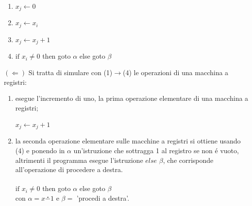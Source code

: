\begin{enumerate}
\item 
 $x_j \leftarrow 0$ \hspace{10mm} 
 \vspace{10mm}

\item $x_j \leftarrow x_i $ \hspace{10mm} 
\vspace{10mm}

\item $x_j \leftarrow x_j+1$ \hspace{10mm} 
\vspace{10mm}

\item $\textrm{if }x_i \neq0$ then goto $\alpha$ else goto
  $\beta$ \hspace{10mm} 

\end{enumerate}
	
$(\Leftarrow)$ Si tratta di simulare con (1)$\rightarrow$(4) le
operazioni di una macchina a registri:
\begin{enumerate}
\item esegue l'incremento di uno, la prima operazione elementare di
  una macchina a registri;\\ \\
\hspace{10mm} 
\hspace{10mm} $x_j \leftarrow x_j+1$

\item la seconda operazione elementare sulle macchine a registri si
  ottiene usando (4) e ponendo in $\alpha$ un'istruzione che sottragga
  1 al registro se non \'e vuoto, altrimenti il programma esegue
  l'istruzione $else$ $\beta$, che corrisponde all'operazione di
  procedere a destra.\\ \\ 
 \hspace{10mm} $\textrm{if }x_i \neq 0$ then goto $\alpha$ else goto
 $\beta$ \\ con $\alpha = x \stackrel{\centerdot}{-} 1$ e $\beta=$
 'procedi a destra'.
\end{enumerate}

